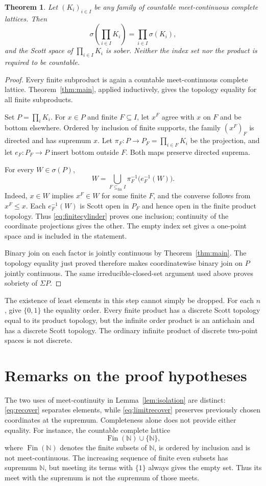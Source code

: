 \documentclass[preprint,11pt]{elsarticle}
\newtheorem{theorem}{Theorem}[section]
\theoremstyle{definition}
\theoremstyle{remark}
\numberwithin{equation}{section}
\newcommand{\N}{\mathbb N}
\newcommand{\Sc}{\sigma}
\newcommand{\Sig}{\Sigma}
\newcommand{\Fin}{\operatorname{Fin}}
\begin{document}
\begin{theorem}\label{thm:arbitrary-products}
Let $(K_i)_{i\in I}$ be any family of countable meet-continuous complete lattices. Then
\[
 \Sc\!\left(\prod_{i\in I}K_i\right)
 =\prod_{i\in I}\Sc(K_i),
\]
and the Scott space of $\prod_{i\in I}K_i$ is sober. Neither the index set nor the product is required to be countable.
\end{theorem}
\begin{proof}
Every finite subproduct is again a countable meet-continuous complete lattice. Theorem~\ref{thm:main}, applied inductively, gives the topology equality for all finite subproducts.

Set $P=\prod_iK_i$. For $x\in P$ and finite $F\subseteq I$, let $x^F$ agree with $x$ on $F$ and be bottom elsewhere. Ordered by inclusion of finite supports, the family $(x^F)_F$ is directed and has supremum $x$. Let $\pi_F:P\to P_F=\prod_{i\in F}K_i$ be the projection, and let $e_F:P_F\to P$ insert bottom outside $F$. Both maps preserve directed suprema.

For every $W\in\Sc(P)$,
\begin{equation}\label{eq:finitecylinder}
 W=\bigcup_{F\subseteq_{\mathrm{fin}} I}
       \pi_F^{-1}\bigl(e_F^{-1}(W)\bigr).
\end{equation}
Indeed, $x\in W$ implies $x^F\in W$ for some finite $F$, and the converse follows from $x^F\le x$. Each $e_F^{-1}(W)$ is Scott open in $P_F$ and hence open in the finite product topology. Thus \eqref{eq:finitecylinder} proves one inclusion; continuity of the coordinate projections gives the other. The empty index set gives a one-point space and is included in the statement.

Binary join on each factor is jointly continuous by Theorem~\ref{thm:main}. The topology equality just proved therefore makes coordinatewise binary join on $P$ jointly continuous. The same irreducible-closed-set argument used above proves sobriety of $\Sig P$.
\end{proof}

The existence of least elements in this step cannot simply be dropped. For each $n$, give $\{0,1\}$ the equality order. Every finite product has a discrete Scott topology equal to its product topology, but the infinite order product is an antichain and has a discrete Scott topology. The ordinary infinite product of discrete two-point spaces is not discrete.

\section{Remarks on the proof hypotheses}
The two uses of meet-continuity in Lemma~\ref{lem:isolation} are distinct: \eqref{eq:recover} separates elements, while \eqref{eq:limitrecover} preserves previously chosen coordinates at the supremum. Completeness alone does not provide either equality. For instance, the countable complete lattice
\[
 \Fin(\N)\cup\{\N\},
\]
where $\Fin(\N)$ denotes the finite subsets of $\N$, is ordered by inclusion and is not meet-continuous. The increasing sequence of finite even subsets has supremum $\N$, but meeting its terms with $\{1\}$ always gives the empty set. Thus its meet with the supremum is not the supremum of those meets.
\end{document}
